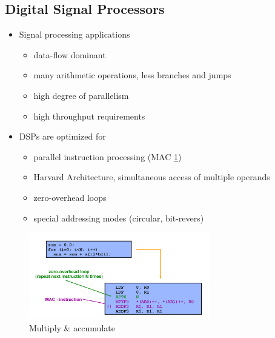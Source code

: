 \subsection{Digital Signal Processors}
\begin{itemize}
	\item Signal processing applications
	\begin{itemize}
		\item data-flow dominant
		\item many arithmetic operations, less branches and jumps
		\item high degree of parallelism
		\item high throughput requirements
	\end{itemize}
	\item DSPs are optimized for
	\begin{itemize}
		\item parallel instruction processing (MAC \cref{fig:MAC})
		\item Harvard Architecture, simultaneous access of multiple operands
		\item zero-overhead loops
		\item special addressing modes (circular, bit-revers)
	\end{itemize}
\end{itemize}

\begin{figure}
\begin{center}
	\includegraphics[width=0.7\textwidth]{images/MAC.png}
	\caption{Multiply \& accumulate}
	\label{fig:MAC}
\end{center}
\end{figure}


